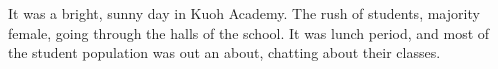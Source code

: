 \documentclass{article}
\begin{document}
    It was a bright, sunny day in Kuoh Academy. The rush of students, majority female, going through the halls of the school. 
    It was lunch period, and most of the student population was out an about, chatting about their classes.
\end{document}
